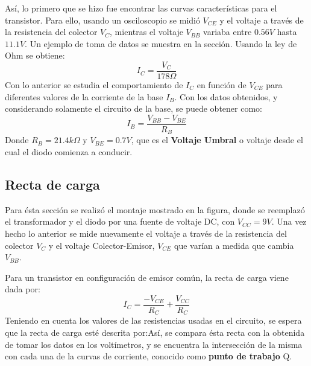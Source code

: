 Así, lo primero que se hizo fue encontrar las curvas características para el transistor. Para ello, usando un osciloscopio se midió $V_{CE}$ y el voltaje a través de la resistencia del colector $V_{C}$, mientras el voltaje $V_{BB}$ variaba entre $0.56 V$ hasta $11.1 V$. Un ejemplo de toma de datos se muestra en la sección. Usando la ley de Ohm se obtiene:
\begin{equation}
    I_{C}=\frac{V_{C}}{178 \Omega}
\end{equation}
Con lo anterior se estudia el comportamiento de $I_{C}$ en función de $V_{CE}$ para diferentes valores de la corriente de la base $I_{B}$. Con los datos obtenidos, y considerando solamente el circuito de la base, se puede obtener como:
\begin{equation}
    I_{B}=\frac{V_{BB}-V_{BE}}{R_{B}}
\end{equation}
Donde $R_{B}=21.4 k\Omega$ y $V_{BE}=0.7 V$, que es el \textbf{Voltaje Umbral} o voltaje desde el cual el diodo comienza a conducir.
\subsection{Recta de carga}
Para ésta sección se realizó el montaje mostrado en la figura, donde se reemplazó el transformador y el diodo por una fuente de voltaje DC, con $V_{CC}=9V$. Una vez hecho lo anterior se mide nuevamente el voltaje a través de la resistencia del colector $V_{C}$ y el voltaje Colector-Emisor, $V_{CE}$ que varían a medida que cambia $V_{BB}$.

Para un transistor en configuración de emisor común, la recta de carga viene dada por:
\begin{equation}
    I_{C} = \frac{-V_{CE}}{R_{C}}+\frac{V_{CC}}{R_{C}}
\end{equation}
Teniendo en cuenta los valores de las resistencias usadas en el circuito, se espera que la recta de carga esté descrita por:Así, se compara ésta recta con la obtenida de tomar los datos en los voltímetros, y se encuentra la intersección de la misma con cada una de la curvas de corriente, conocido como \textbf{punto de trabajo} Q.
